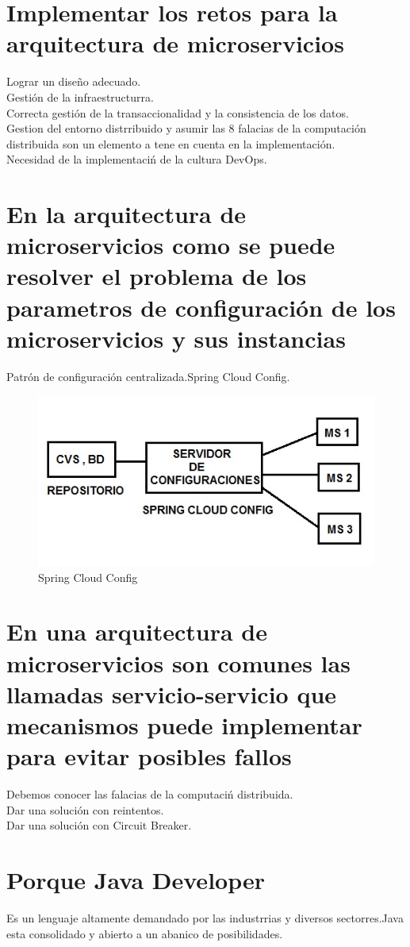 \section{Implementar los retos para la arquitectura de microservicios}
Lograr un dise\~no adecuado.\\
Gesti\'on de la infraestructurra.\\
Correcta gesti\'on de la transaccionalidad y la consistencia de los datos.\\
Gestion del entorno distrribuido y asumir las 8 falacias de la computaci\'on distribuida son un elemento a tene en cuenta
en la implementaci\'on.\\
Necesidad de la implementaci\'n de la cultura DevOps.
\section{En la arquitectura de microservicios como se puede resolver el problema de los parametros
 de configuraci\'on de los microservicios y sus instancias}
Patr\'on de configuraci\'on centralizada.Spring Cloud Config.
\begin{figure}[H]
	\centering
	\includegraphics[scale=0.7]{images/fig_1_1.jpg}
	\caption{Spring Cloud Config}
\end{figure}
\section{En una arquitectura de microservicios son comunes las llamadas servicio-servicio que mecanismos
	puede implementar para evitar posibles fallos}
Debemos conocer las falacias de la computaci\'n distribuida.\\
Dar una soluci\'on con reintentos.\\
Dar una soluci\'on con Circuit Breaker.
 \section{Porque Java Developer}
 Es un lenguaje altamente demandado por las industrrias y diversos sectorres.Java esta consolidado y abierto a un abanico de posibilidades.
